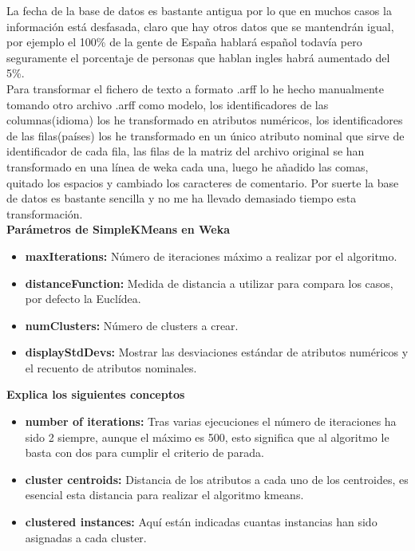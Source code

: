 \documentclass[es]{ifirak}
\begin{document}
La fecha de la base de datos es bastante antigua por lo que en muchos casos la información está desfasada, claro que hay otros datos que se mantendrán igual, por ejemplo el 100\% de la gente de España hablará español todavía pero seguramente el porcentaje de personas que hablan ingles habrá aumentado del 5\%.\\

Para transformar el fichero de texto a formato .arff lo he hecho manualmente tomando otro archivo .arff como modelo, los identificadores de las columnas(idioma) los he transformado en atributos numéricos, los identificadores de las filas(países) los he transformado en un único atributo nominal que sirve de identificador de cada fila, las filas de la matriz del archivo original se han transformado en una línea de weka cada una, luego he añadido las comas, quitado los espacios y cambiado los caracteres de comentario. Por suerte la base de datos es bastante sencilla y no me ha llevado demasiado tiempo esta transformación.\\

 
\textbf{Parámetros de SimpleKMeans en Weka}
\begin{itemize}
	\item \textbf{maxIterations:} Número de iteraciones máximo a realizar por el algoritmo.
	
	\item \textbf{distanceFunction:} Medida de distancia a utilizar para compara los casos, por defecto la Euclídea.
	
	\item \textbf{numClusters:} Número de clusters a crear.
	\item \textbf{displayStdDevs:} Mostrar las desviaciones estándar de atributos numéricos y el recuento de atributos nominales.
\end{itemize}

\textbf{Explica los siguientes conceptos}
\begin{itemize}
	\item  \textbf{number of iterations:} Tras varias ejecuciones el número de iteraciones ha sido 2 siempre, aunque el máximo es 500, esto significa que al algoritmo le basta con dos para cumplir el criterio de parada.
	
	\item \textbf{cluster centroids:} Distancia de los atributos a cada uno de los centroides, es esencial esta distancia para realizar el algoritmo kmeans. 
	\item \textbf{clustered instances:}  Aquí están indicadas cuantas instancias han sido asignadas a cada cluster.
	
\end{itemize}
\end{document}
